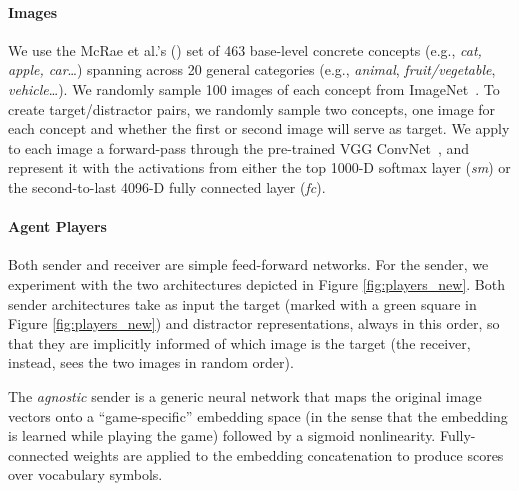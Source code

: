\paragraph{Images} We use the McRae et al.'s
(\citeyear{McRae:etal:2005}) set of 463 base-level concrete concepts
(e.g., \emph{cat, apple, car}\ldots) spanning across 20 general
categories (e.g., \emph{animal}, \emph{fruit/vegetable},
\emph{vehicle}\ldots). We randomly sample 100 images of each concept
from ImageNet~\citep{Deng:etal:2009}. To create target/distractor
pairs, we randomly sample two concepts, one image for each concept and
whether the first or second image will serve as target. We apply to
each image a forward-pass through the pre-trained VGG
ConvNet~\citep{Simonyan:Zisserman:2014}, and represent it with the
activations from either the top 1000-D softmax layer (\emph{sm}) or the
second-to-last 4096-D fully connected layer (\emph{fc}). %
%

\paragraph{Agent Players} Both sender and receiver are simple
feed-forward networks.  For the sender, we experiment with the two
architectures depicted in Figure \ref{fig:players_new}. Both  sender architectures take as input
the target (marked with a green square in Figure \ref{fig:players_new}) and distractor representations, always in this order, so that they are implicitly informed of which image is the target (the receiver, instead, sees the two images in random order). 

The \emph{agnostic} sender is a generic neural network that maps the
original image vectors onto a ``game-specific'' embedding space (in
the sense that the embedding is learned while playing the game)
followed by a sigmoid nonlinearity.   Fully-connected
weights are applied to the embedding concatenation to produce scores over vocabulary
symbols.

